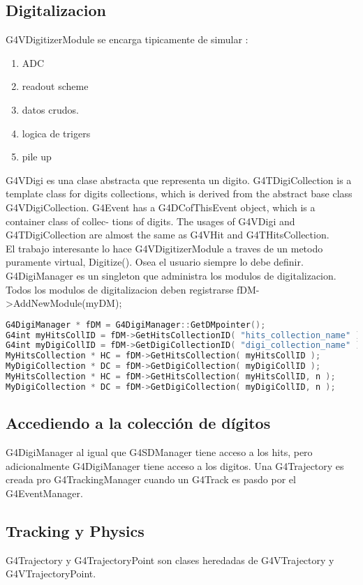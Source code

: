 \documentclass[10pt,a4paper,oneside]{book}
\begin{document}
\subsection*{Digitalizacion}
G4VDigitizerModule se encarga tipicamente de simular :
\begin{enumerate}
\item ADC
\item readout scheme
\item datos crudos.
\item logica de trigers
\item pile up
\end{enumerate}
G4VDigi es una clase abstracta que representa un digito.
G4TDigiCollection is a template class for digits collections, which is
derived from the abstract base class G4VDigiCollection. G4Event has a
G4DCofThisEvent object, which is a container class of collec- tions of
digits. The usages of G4VDigi and G4TDigiCollection are almost the
same as G4VHit and G4THitsCollection.
\\
El trabajo interesante lo hace G4VDigitizerModule a traves de un
metodo puramente virtual, Digitize(). Osea el usuario siempre lo debe
definir.
\\
G4DigiManager es un singleton que administra los modulos de
digitalizacion. Todos los modulos de digitalizacion deben registrarse
fDM->AddNewModule(myDM);
\begin{lstlisting}[language=C++, frame = single]
G4DigiManager * fDM = G4DigiManager::GetDMpointer();
G4int myHitsCollID = fDM->GetHitsCollectionID( "hits_collection_name" );
G4int myDigiCollID = fDM->GetDigiCollectionID( "digi_collection_name" );
MyHitsCollection * HC = fDM->GetHitsCollection( myHitsCollID );
MyDigiCollection * DC = fDM->GetDigiCollection( myDigiCollID );
MyHitsCollection * HC = fDM->GetHitsCollection( myHitsCollID, n );
MyDigiCollection * DC = fDM->GetDigiCollection( myDigiCollID, n );
\end{lstlisting}



\subsection*{Accediendo a la colección de dígitos}
G4DigiManager al igual que G4SDManager tiene acceso a los hits, pero
adicionalmente G4DigiManager tiene acceso a los digitos. Una
G4Trajectory es creada pro G4TrackingManager cuando un G4Track es
pasdo por el G4EventManager.

\subsection*{Tracking y Physics }
G4Trajectory y G4TrajectoryPoint son clases heredadas de G4VTrajectory
y G4VTrajectoryPoint.
\end{document}
